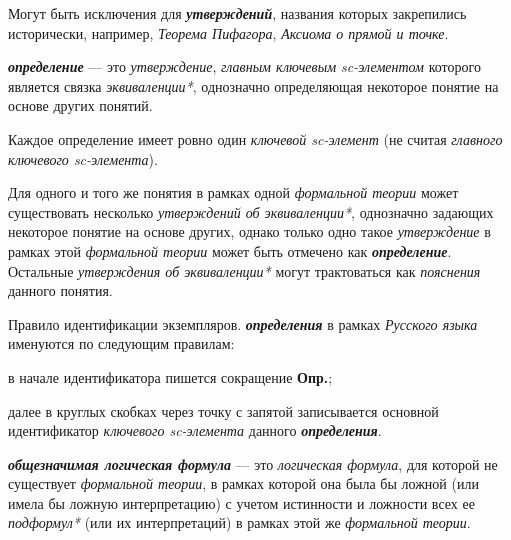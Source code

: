 Могут быть исключения для \textbf{\textit{утверждений}}, названия которых закрепились исторически, например, \textit{Теорема Пифагора}, \textit{Аксиома о прямой и точке}.



\textbf{\textit{определение}} --- это \textit{утверждение}, \textit{главным ключевым sc-элементом\scnrolesign} которого является связка \textit{эквиваленции*}, однозначно определяющая некоторое понятие на основе других понятий.

Каждое определение имеет ровно один \textit{ключевой sc-элемент\scnrolesign} (не считая \textit{главного ключевого sc-элемента\scnrolesign}).

Для одного и того же понятия в рамках одной \textit{формальной теории} может существовать несколько \textit{утверждений об эквиваленции*}, однозначно задающих некоторое понятие на основе других, однако только одно такое \textit{утверждение} в рамках этой \textit{формальной теории} может быть отмечено как \textbf{\textit{определение}}. Остальные \textit{утверждения об эквиваленции*} могут трактоваться как \textit{пояснения} данного понятия.

Правило идентификации экземпляров. \textbf{\textit{определения}} в рамках \textit{Русского языка} именуются по следующим правилам:
\begin{textitemize}
	\item{в начале идентификатора пишется сокращение \textbf{Опр.};}
	\item{далее в круглых скобках через точку с запятой записывается основной идентификатор  \textit{ключевого sc-элемента\scnrolesign} данного \textbf{\textit{определения}}.}
\end{textitemize}


\begin{SCn}
\end{SCn}
\textbf{\textit{общезначимая логическая формула}} --- это \textit{логическая формула}, для которой не существует \textit{формальной теории}, в рамках которой она была бы ложной (или имела бы ложную интерпретацию) с учетом истинности и ложности всех ее \textit{подформул*} (или их интерпретаций) в рамках этой же \textit{формальной теории}.

